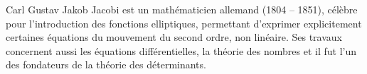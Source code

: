 \documentclass[a4paper,french,bookmarks]{article}
\begin{document}
    \small{Carl Gustav Jakob Jacobi est un mathématicien allemand (1804 – 1851), célèbre pour l’introduction des fonctions
elliptiques, permettant d’exprimer explicitement certaines équations du mouvement du second ordre, non linéaire.
Ses travaux concernent aussi les équations différentielles, la théorie des nombres et il fut l’un des fondateurs de la
théorie des déterminants.}
\end{document}
